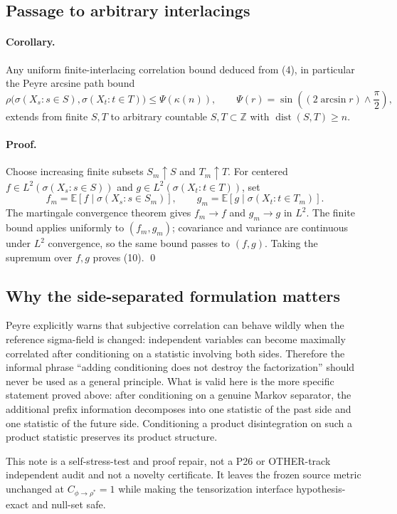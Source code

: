 \subsection{Passage to arbitrary interlacings}

\paragraph{Corollary.}
Any uniform finite-interlacing correlation bound deduced from (4), in
particular the Peyre arcsine path bound
\[
 \rho\bigl(\sigma(X_s:s\in S),\sigma(X_t:t\in T)\bigr)
 \le \Psi(\kappa(n)),
 \qquad
 \Psi(r)=\sin\!\left((2\arcsin r)\wedge\frac\pi2\right),
\tag{10}
\]
extends from finite $S,T$ to arbitrary countable $S,T\subset\mathbb Z$ with
$\operatorname{dist}(S,T)\ge n$.

\paragraph{Proof.}
Choose increasing finite subsets $S_m\uparrow S$ and $T_m\uparrow T$.  For
centered $f\in L^2(\sigma(X_s:s\in S))$ and
$g\in L^2(\sigma(X_t:t\in T))$, set
\[
 f_m=\mathbb E[f\mid\sigma(X_s:s\in S_m)],\qquad
 g_m=\mathbb E[g\mid\sigma(X_t:t\in T_m)].
\]
The martingale convergence theorem gives $f_m\to f$ and $g_m\to g$ in $L^2$.
The finite bound applies uniformly to $(f_m,g_m)$; covariance and variance are
continuous under $L^2$ convergence, so the same bound passes to $(f,g)$.
Taking the supremum over $f,g$ proves (10). \qed

\subsection{Why the side-separated formulation matters}

Peyre explicitly warns that subjective correlation can behave wildly when the
reference sigma-field is changed: independent variables can become maximally
correlated after conditioning on a statistic involving both sides.  Therefore
the informal phrase ``adding conditioning does not destroy the factorization''
should never be used as a general principle.  What is valid here is the more
specific statement proved above: after conditioning on a genuine Markov
separator, the additional prefix information decomposes into one statistic of
the past side and one statistic of the future side.  Conditioning a product
disintegration on such a product statistic preserves its product structure.

This note is a self-stress-test and proof repair, not a P26 or OTHER-track
independent audit and not a novelty certificate.  It leaves the frozen source
metric unchanged at $C_{\phi\to\rho^*}=1$ while making the tensorization
interface hypothesis-exact and null-set safe.
